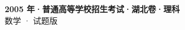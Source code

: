\documentclass[zihao=-4, a4paper]{ctexart}
\begin{document}
\begin{center}
  {\Large\bfseries 2005 年·普通高等学校招生考试·湖北卷·理科}\\[4pt]
  {\large 数学 · 试题版}
\end{center}
\medskip
{}

\end{document}
